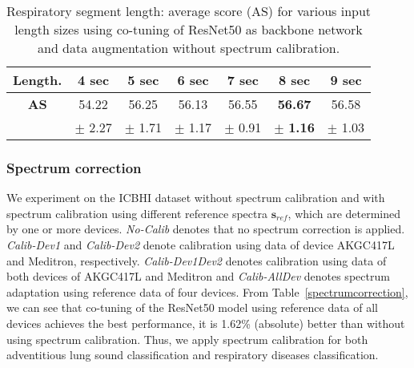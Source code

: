 \documentclass[journal]{IEEEtran}
\begin{document}
\begin{table}[t]
        \renewcommand{\arraystretch}{1.3}
        \caption{Respiratory segment length: average score (AS) for various input length sizes using co-tuning of ResNet50 as backbone network and data augmentation without spectrum calibration.}
        \label{fixedlength}
        \centering
        \scalebox{0.85} {
        \begin{tabular}{c c c c c c c}
            \hline
            \textbf{Length.}  & \textbf{4 sec} & \textbf{5 sec} & \textbf{6 sec} & \textbf{7 sec} & \textbf{8 sec} & \textbf{9 sec} \\
            \hline
            \textbf{AS} & 54.22 & 56.25 & 56.13 & 56.55 & \textbf{56.67} & 56.58\\
               & $\pm$ 2.27 & $\pm$ 1.71 & $\pm$ 1.17 & $\pm$ 0.91 & $\pm$ \textbf{1.16} & $\pm$ 1.03\\
            \hline
        \end{tabular}}
    \end{table}

   
\subsubsection{Spectrum correction}
We experiment on the ICBHI dataset without spectrum calibration and with spectrum calibration using different reference spectra $\boldsymbol s_{ref}$, which are determined by one or more devices. \textit{No-Calib} denotes that no spectrum correction is applied. \textit{Calib-Dev1} and \textit{Calib-Dev2} denote calibration using data of device AKGC417L and Meditron, respectively. \textit{Calib-Dev1Dev2} denotes calibration using data of both devices of AKGC417L and Meditron and \textit{Calib-AllDev} denotes spectrum adaptation using reference data of four devices. From Table~\ref{spectrumcorrection}, we can see that co-tuning of the ResNet50 model using reference data of all devices achieves the best performance, it is 1.62\% (absolute) better than without using spectrum calibration. Thus, we apply spectrum calibration for both adventitious lung sound classification and respiratory diseases classification.
\begin{table}[t]
    \renewcommand{\arraystretch}{1.3}
    \caption{Comparison of spectrum correction methods using different reference data. Co-tuning of the ResNet50 with data augmentation is used.}
    \label{spectrumcorrection}
    \centering
    \end{table}
\end{document}

